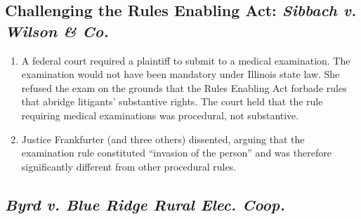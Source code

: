 \subsection{Challenging the Rules Enabling Act: \emph{Sibbach v. Wilson \& Co.}}

\begin{enumerate}
    \item A federal court required a plaintiff to submit to a medical examination. The examination would not have been mandatory under Illinois state law. She refused the exam on the grounds that the Rules Enabling Act forbade rules that abridge litigants' substantive rights. The court held that the rule requiring medical examinations was procedural, not substantive.
    \item Justice Frankfurter (and three others) dissented, arguing that the examination rule constituted ``invasion of the person'' and was therefore significantly different from other procedural rules.
\end{enumerate}

\subsection{\emph{Byrd v. Blue Ridge Rural Elec. Coop.}}

